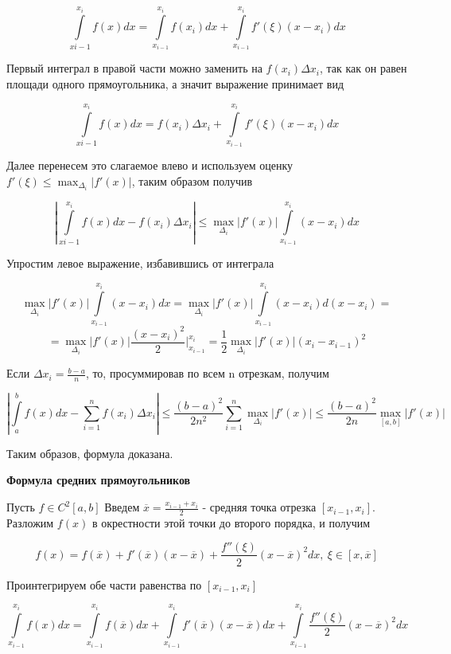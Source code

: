 \documentclass[12pt, a4paper]{report}
\begin{document}
	\[ \int\limits_{x{i-1}}^{x_i} f(x)dx = \int\limits_{x_{i-1}}^{x_i} f(x_i)dx + \int\limits_{x_{i-1}}^{x_i} f'(\xi)(x - x_i)dx\]
	
	Первый интеграл в правой части можно заменить на $f(x_i) \Delta x_i$, так как он равен площади одного прямоугольника, а значит выражение принимает вид 
	
	\[ \int\limits_{x{i-1}}^{x_i} f(x)dx = f(x_i) \Delta x_i + \int\limits_{x_{i-1}}^{x_i} f'(\xi)(x - x_i)dx\]
	
	Далее перенесем это слагаемое влево и используем оценку $f'(\xi) \leq \max_{\Delta_i} |f'(x)|$, таким образом получив
	
	\[ \left| \int\limits_{x{i-1}}^{x_i} f(x)dx - f(x_i) \Delta x_i \right| \leq \max_{\Delta_i} |f'(x)| \int\limits_{x_{i-1}}^{x_i} (x - x_i)dx\]
	
	Упростим левое выражение, избавившись от интеграла
	
	\[ \max_{\Delta_i} |f'(x)| \int\limits_{x_{i-1}}^{x_i} (x - x_i)dx = \max_{\Delta_i} |f'(x)| \int\limits_{x_{i-1}}^{x_i} (x - x_i)d(x - x_i) = \]
	\[ = \max_{\Delta_i} |f'(x)| \frac{(x-x_i)^2}{2} \Bigg|_{x_{i-1}}^{x_i} = \frac{1}{2} \max_{\Delta_i} |f'(x)| (x_i - x_{i-1})^2 \]
	
	Если $ \Delta x_i = \frac{b-a}{n}$, то, просуммировав по всем n отрезкам, получим
	
	\[ \left| \int\limits_{a}^{b} f(x)dx - \sum_{i=1}^{n} f(x_i) \Delta x_i \right| \leq \frac{(b-a)^2}{2n^2} \sum_{i=1}^{n} \max_{\Delta_i}|f'(x)| \leq \frac{(b-a)^2}{2n} \max_{[a, b]}|f'(x)|\]
	
	Таким образов, формула доказана.
	
	\newpage
	
	\textbf{Формула средних прямоугольников}
	
	Пусть $f \in C^2[a, b]$
	Введем $\overline{x} = \frac{x_{i-1} + x_i}{2}$ - средняя точка отрезка $[x_{i-1}, x_i]$. Разложим $f(x)$ в окрестности этой точки до второго порядка, и получим
	
	\[ f(x) = f(\overline{x}) + f'(\overline{x})(x - \overline{x}) + \frac{f''(\xi)}{2} (x - \overline{x})^2 dx, \ \xi \in [x, \overline{x}]\]
	
	Проинтегрируем обе части равенства по $[x_{i-1}, x_i]$
	
	\[ \int\limits_{x_{i-1}}^{x_i} f(x)dx = \int\limits_{x_{i-1}}^{x_i} f(\overline{x})dx + \int\limits_{x_{i-1}}^{x_i} f'(\overline{x})(x - \overline{x})dx + \int\limits_{x_{i-1}}^{x_i} \frac{f''(\xi)}{2} (x - \overline{x})^2 dx\]
	
\end{document}
